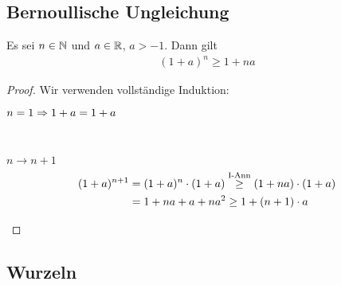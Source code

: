 \subsection{Bernoullische Ungleichung}

\begin{satz}
    \label{satz:bernoulli-ungleichung}
    Es sei $n\in\mathbb{N}$ und $a\in\mathbb{R}$, $a > -1$. Dann gilt
    \begin{align*}
    (1+a)
        ^n \geq 1+na
    \end{align*}
    \begin{proof}
        Wir verwenden vollständige Induktion:\\
        \begin{induktionsanfang}
            $n=1 \Rightarrow{} 1+a = 1+a$
        \end{induktionsanfang}
        \\
        \begin{induktionsschritt}
            $n\rightarrow n+1$
            \begin{align*}
            (1+a)
                ^{n+1} &= (1+a)^n\cdot (1+a) \overset{\text{I-Ann}}{\geq} (1+na)\cdot(1+a) \\
                &= 1+na+a+na^2\geq 1+(n+1)\cdot a\qedhere
            \end{align*}
        \end{induktionsschritt}
    \end{proof}
\end{satz}


\newpage

\subsection{Wurzeln}

